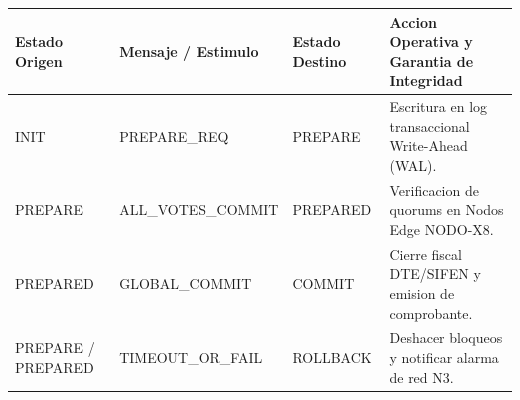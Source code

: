\documentclass[11pt,a4paper]{article}
\begin{document}
\vspace{3mm}

\vspace{1mm}

\noindent
\begin{tabularx}{\linewidth}{@{} l l l X @{}}
  \toprule
  \rowcolor{corpPrimary}
  {\bfseries\color{white}\scriptsize Estado Origen} &
  {\bfseries\color{white}\scriptsize Mensaje / Estimulo} &
  {\bfseries\color{white}\scriptsize Estado Destino} &
  {\bfseries\color{white}\scriptsize Accion Operativa y Garantia de Integridad} \\
  \midrule
  \rowcolor{corpLightBg}
  INIT & PREPARE\_REQ & PREPARE & Escritura en log transaccional Write-Ahead (WAL). \\
  PREPARE & ALL\_VOTES\_COMMIT & PREPARED & Verificacion de quorums en Nodos Edge NODO-X8. \\
  \rowcolor{corpLightBg}
  PREPARED & GLOBAL\_COMMIT & COMMIT & Cierre fiscal DTE/SIFEN y emision de comprobante. \\
  PREPARE / PREPARED & TIMEOUT\_OR\_FAIL & ROLLBACK & Deshacer bloqueos y notificar alarma de red N3. \\
  \bottomrule
\end{tabularx}

\clearpage


\drawchromaticbar[3.5pt]
\vspace{2.5mm}

\vspace{1mm}
\end{document}
